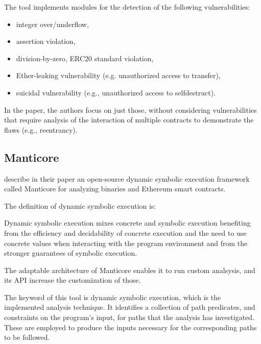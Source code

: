 The tool implements modules for the detection of the following vulnerabilities: 
\begin{itemize}
    \item integer over/underflow,
    \item assertion violation,
    \item division-by-zero, ERC20 standard violation,
    \item Ether-leaking vulnerability (e.g. unauthorized access to transfer),
    \item suicidal vulnerability (e.g., unauthorized access to selfdestruct).
\end{itemize}
In the paper, the authors  focus on just those, without considering vulnerabilities that require analysis of
the interaction of multiple contracts to demonstrate the flaws 
(e.g., reentrancy).

\subsection{Manticore}
\label{sec:Specification:Manticore}
\citet{ManticorePaper} describe in their paper an open-source dynamic
symbolic execution framework called Manticore for analyzing
binaries and Ethereum smart contracts.

The definition of dynamic symbolic execution is:
\begin{definition}
    Dynamic symbolic execution mixes concrete and symbolic execution benefiting from the efficiency and decidability of concrete execution and the need to use concrete 
values when interacting with the program environment and from the stronger guarantees of symbolic execution.
\end{definition}


The adaptable architecture of Manticore enables it to run custom analsysis, 
and its API increase the customization of those. 

The keyword of this tool is dynamic symbolic execution, which is the implemented analysis technique. 
It identifies a collection of path predicates, and constraints on the program's input, 
for paths that the analysis has investigated.
These are employed to produce the inputs necessary for the corresponding paths to be followed. 

